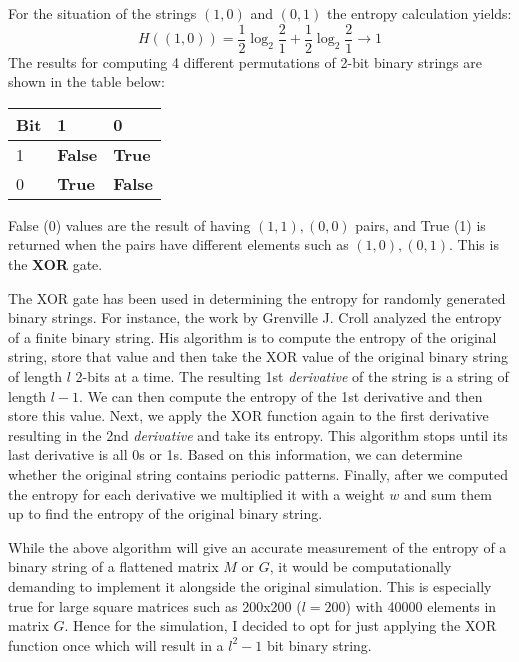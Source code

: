 \vspace{0.3cm}
For the situation of the strings $(1,0)$ and $(0,1)$ the entropy calculation yields:
$$H((1,0))=\frac{1}{2}\log_{2}\frac{2}{1}+\frac{1}{2}\log_{2}\frac{2}{1}\longrightarrow 1$$
The results for computing 4 different permutations of 2-bit binary strings are shown in the table below: 
\begin{center}
\begin{tabular}{ |p{3cm}||p{3cm}||p{3cm}|  }
\hline
Bit& 1 & 0 \\
 \hline
 1  & \textbf{False} & \textbf{True}\\  
 0 &  \textbf{True} & \textbf{False}\\
  \hline
\end{tabular}
\end{center}
 False (0) values are the result of having $(1,1), (0,0)$ pairs, and True (1) is returned when the pairs have different elements such as $(1,0), (0,1)$. This is the \textbf{XOR} gate. \par

\pagebreak
 The XOR gate has been used in determining the entropy for randomly generated binary strings. For instance, the work by Grenville J. Croll \cite{Grenville_J_Croll:2013} analyzed the entropy of a finite binary string. His algorithm is to compute the entropy of the original string, store that value and then take the XOR value of the original binary string of length $l$ 2-bits at a time. The resulting 1st \emph{derivative} of the string is a string of length $l-1$. We can then compute the entropy of the 1st derivative and then store this value. Next, we apply the XOR function again to the first derivative resulting in the 2nd \emph{derivative} and take its entropy. This algorithm stops until its last derivative is all 0s or 1s. Based on this information, we can determine whether the original string contains periodic patterns. Finally, after we computed the entropy for each derivative we multiplied it with a weight $w$ and sum them up to find the entropy of the original binary string. \par

 \vspace{0.3cm}
 While the above algorithm will give an accurate measurement of the entropy of a binary string of a flattened matrix $M$ or $G$, it would be computationally demanding to implement it alongside the original simulation. This is especially true for large square matrices such as 200x200 ($l=200$) with 40000 elements in matrix $G$. Hence for the simulation, I decided to opt for just applying the XOR function once which will result in a $l^2-1$ bit binary string. \par

